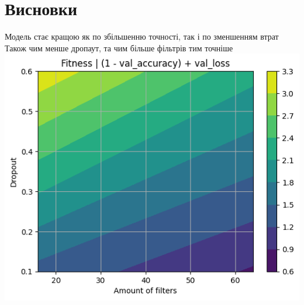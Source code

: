 \documentclass{article}
\begin{document}
    \section{Висновки}
            Модель стає кращою як по збільшенню точності, так і по зменшенням втрат
            Також чим менше дропаут, та чим більше фільтрів тим точніше
    \newpage
            \includegraphics{Landscape.png}
\end{document}
